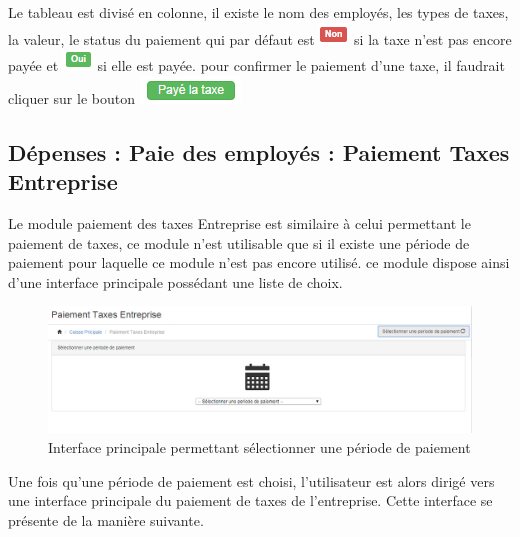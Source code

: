 \documentclass[12pt,a4paper]{report}
\begin{document}
Le tableau est divisé en colonne, il existe le nom des employés, les types de taxes, la valeur, le status du paiement qui par défaut est \includegraphics[scale=0.7]{pic/NonTaxes.png} si la taxe n'est pas encore payée et \includegraphics[scale=0.7]{pic/OuiTaxes.png} si elle est payée. pour confirmer le paiement d'une taxe, il faudrait cliquer sur le bouton \includegraphics[scale=0.7]{pic/PayeTaxe.png}


\newpage
\subsection{Dépenses : Paie des employés : Paiement Taxes Entreprise}
Le module paiement des taxes Entreprise est similaire à celui permettant le paiement de taxes,  ce module n'est utilisable que si il existe une période de paiement pour laquelle ce module n'est pas encore utilisé. ce module dispose ainsi d'une interface principale possédant une liste de choix.

\begin{figure}[h]
\begin{center}
\includegraphics[width=14cm]{pic/PaieTaxesEntre.png}
\end{center}
\caption{Interface principale permettant sélectionner une période de paiement}
\label{Interface principale permettant sélectionner une période de paiement}
\end{figure}

Une fois qu'une période de paiement est choisi, l'utilisateur est alors dirigé vers une interface principale du paiement de taxes de l'entreprise. Cette interface se présente de la manière suivante.
\end{document}
